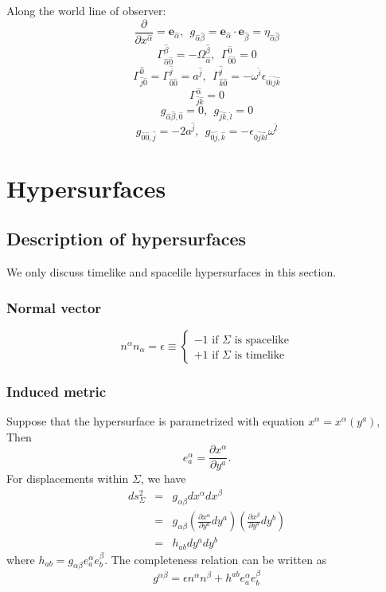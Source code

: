 \noindent
Along the world line of observer:
\[\frac{\partial}{\partial x^{\hat{\alpha}}} = \bm{e}_{\hat{\alpha}}, \ \ g_{\hat{\alpha} \hat{\beta}} = \bm{e}_{\hat{\alpha}} \cdot \bm{e}_{\hat{\beta}} = \eta_{\hat{\alpha}\hat{\beta}}\]
\[\Gamma^{\hat{\beta}}_{\hat{\alpha} \hat{0}} = - \Omega^{\hat{\beta}}_{\hat{\alpha}}, \ \ \Gamma^{\hat{0}}_{\hat{0} \hat{0}} =0\]
\[\Gamma^{\hat{0}}_{\hat{j} \hat{0}} = \Gamma^{\hat{j}}_{\hat{0} \hat{0}} = a^{\hat{j}}, \ \ \Gamma^{\hat{j}}_{\hat{k} \hat{0}} = -\omega^{\hat{i}} \epsilon_{0 \hat{i} \hat{j} \hat{k}} \]
\[\Gamma^{\hat{\alpha}}_{\hat{j} \hat{k}} = 0 \]
\[g_{\hat{\alpha} \hat{\beta},\hat{0}} = 0, \ \ g_{\hat{j} \hat{k},\hat{l}} = 0\]
\[g_{\hat{0} \hat{0},\hat{j}} = -2 a^{\hat{j}}, \ \ g_{\hat{0} \hat{j},\hat{k}} = -\epsilon_{0 \hat{j} \hat{k} \hat{l}} \omega^{\hat{l}}\]

\section{Hypersurfaces}
\subsection{Description of hypersurfaces}
\begin{note}
We only discuss timelike and spacelile hypersurfaces in this section.
\end{note}
\subsubsection{Normal vector}
\[n^{\alpha}n_{\alpha} = \epsilon \equiv \begin{cases} -1 \mbox{ if  } \Sigma \mbox{ is spacelike}\\ +1 \mbox{ if  } \Sigma \mbox{ is timelike}\end{cases} \]
\subsubsection{Induced metric}
\noindent
Suppose that the hypersurface is parametrized with equation $x^{\alpha} = x^{\alpha}(y^a)$, Then
\[e_{a}^{\alpha} = \frac{\partial x^{\alpha}}{\partial y^a}.\]
For displacements within $\Sigma$, we have
\begin{eqnarray}
ds_{\Sigma}^{2} &=& g_{\alpha \beta} dx^{\alpha} dx^{\beta} \nonumber \\
&=& g_{\alpha \beta} (\frac{\partial x^{\alpha}}{\partial y^a} dy^a) (\frac{\partial x^{\beta}}{\partial y^b} dy^b) \nonumber \\
&=& h_{ab} dy^a dy^b \nonumber
\end{eqnarray}
where $h_{ab} = g_{\alpha \beta} e_{a}^{\alpha} e_{b}^{\beta}$.
The completeness relation can be written as
\[g^{\alpha \beta} = \epsilon n^{\alpha} n^{\beta} + h^{ab}e_{a}^{\alpha} e_{b}^{\beta} \]

